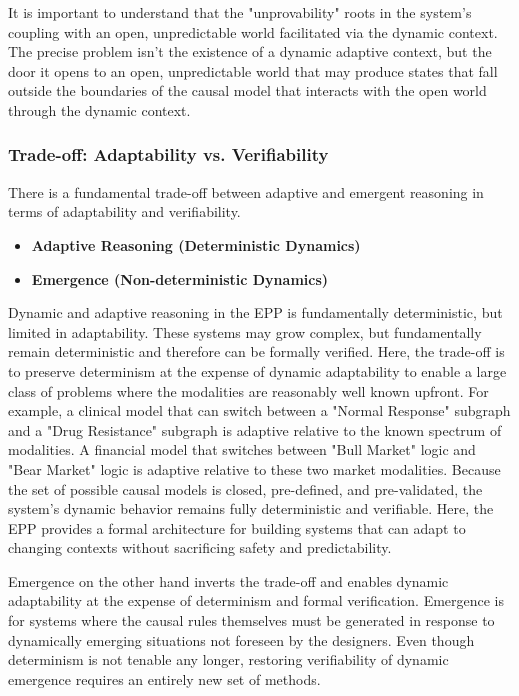 It is important to understand that the "unprovability" roots in the system's coupling with an open, unpredictable world facilitated via the dynamic context. The precise problem isn't the existence of a dynamic adaptive context, but the door it opens to an open, unpredictable world that may produce states that fall outside the boundaries of the causal model that interacts with the open world through the dynamic context. 

\subsubsection{Trade-off: Adaptability vs. Verifiability}


There is a fundamental trade-off between adaptive and emergent reasoning in terms of adaptability and verifiability.     


\begin{itemize}
	\item \textbf{Adaptive Reasoning (Deterministic Dynamics)}
	\item \textbf{Emergence (Non-deterministic Dynamics)}
\end{itemize}

Dynamic and adaptive reasoning in the EPP is fundamentally deterministic, but limited in adaptability. These systems may grow complex, but fundamentally remain deterministic and therefore can be formally verified. Here, the trade-off is to preserve determinism at the expense of dynamic adaptability to enable a large class of problems where the modalities are reasonably well known upfront. For example, a clinical model that can switch between a "Normal Response" subgraph and a "Drug Resistance" subgraph is adaptive relative to the known spectrum of modalities. A financial model that switches between "Bull Market" logic and "Bear Market" logic is adaptive relative to these two market modalities. Because the set of possible causal models is closed, pre-defined, and pre-validated, the system's dynamic behavior remains fully deterministic and verifiable. Here, the EPP provides a formal architecture for building systems that can adapt to changing contexts without sacrificing safety and predictability.
 
Emergence on the other hand inverts the trade-off and enables dynamic adaptability at the expense of determinism and formal verification. Emergence is for systems where the causal rules themselves must be generated in response to dynamically emerging situations not foreseen by the designers. Even though determinism is not tenable any longer, restoring verifiability of dynamic emergence requires an entirely new set of methods. 

